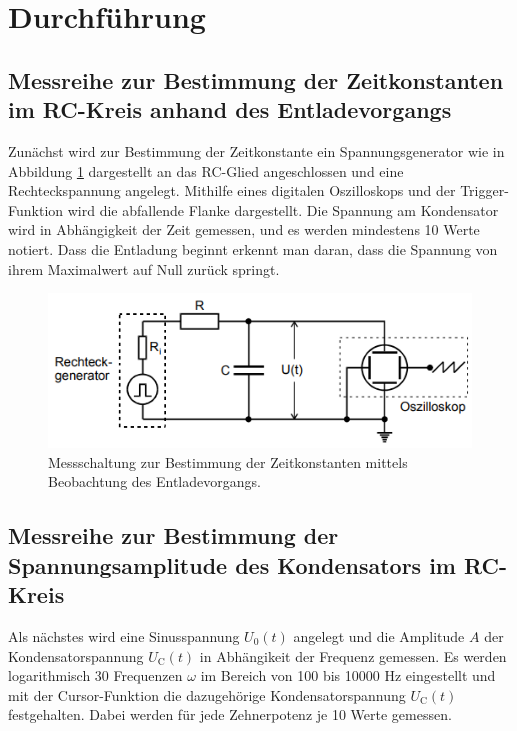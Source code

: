 \section{Durchführung}
\label{sec:Durchführung}

\subsection{Messreihe zur Bestimmung der Zeitkonstanten im RC-Kreis anhand des Entladevorgangs}

Zunächst wird zur Bestimmung der Zeitkonstante ein Spannungsgenerator
wie in Abbildung \ref{fig:v353_1} dargestellt an das RC-Glied angeschlossen und eine Rechteckspannung angelegt.
Mithilfe eines digitalen Oszilloskops und der Trigger-Funktion wird die abfallende 
Flanke dargestellt. Die Spannung am Kondensator wird in Abhängigkeit der Zeit gemessen, und es werden mindestens 10 Werte notiert.
Dass die Entladung beginnt erkennt man daran, dass die Spannung von ihrem Maximalwert auf Null zurück springt.
\begin{figure}[H]
  \centering
  \includegraphics{V353_1.png}
  \caption{Messschaltung zur Bestimmung der Zeitkonstanten mittels Beobachtung des 
  Entladevorgangs. \cite[S. 6]{kent}}
  \label{fig:v353_1}
\end{figure}

\subsection{Messreihe zur Bestimmung der Spannungsamplitude des Kondensators
im RC-Kreis}
Als nächstes wird eine Sinusspannung $U_\text{0}(t)$ angelegt und die 
Amplitude $A$ der Kondensatorspannung $U_\text{C}(t)$ in Abhängikeit der Frequenz gemessen.
Es werden logarithmisch 30 Frequenzen $\omega$ im Bereich von 100 bis 10000
$\si{\hertz}$ eingestellt und mit der Cursor-Funktion die dazugehörige Kondensatorspannung 
$U_\text{C}(t)$ festgehalten. Dabei werden für jede Zehnerpotenz je 10 Werte gemessen.

